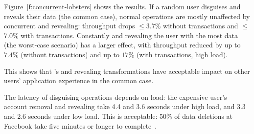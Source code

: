 %
Figure~\ref{f:concurrent-lobsters} shows the results.
%
If a random user disguises and reveals their data (the common case),
normal operations are mostly unaffected by concurrent \xxing and revealing:
throughput drops $\le$3.7\% without transactions and $\le$7.0\% with transactions.
%
Constantly \xxing and revealing the user with the most data (the worst-case
scenario) has a larger effect, with throughput reduced by up to $7.4$\%
(without transactions) and up to $17$\% (with transactions, high load).
%
%
%

This shows that \sys's \xxing and revealing transformations have acceptable
impact on other users' application experience in the common case.
%
%
%

The latency of disguising operations depends on load:
the expensive user's account removal and revealing take 4.4 and 3.6 seconds
under high load, and 3.3 and 2.6 seconds under low load.
%
This is acceptable: 50\% of data deletions at Facebook take five minutes or
longer to complete~\cite{delf}.
%

